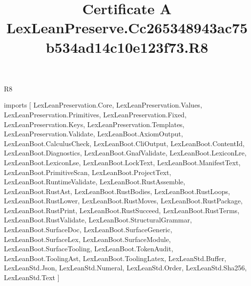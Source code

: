 \begin{lexlean}{R8}
\title{Certificate A LexLeanPreserve.Cc265348943ac75b534ad14c10e123f73.R8}
\begin{coremodule}
imports [
  LexLeanPreservation.Core,
  LexLeanPreservation.Values,
  LexLeanPreservation.Primitives,
  LexLeanPreservation.Fixed,
  LexLeanPreservation.Keys,
  LexLeanPreservation.Templates,
  LexLeanPreservation.Validate,
  LexLeanBoot.AxiomOutput,
  LexLeanBoot.CalculusCheck,
  LexLeanBoot.CliOutput,
  LexLeanBoot.ContentId,
  LexLeanBoot.Diagnostics,
  LexLeanBoot.GnafValidate,
  LexLeanBoot.LexiconLre,
  LexLeanBoot.LexiconLse,
  LexLeanBoot.LockText,
  LexLeanBoot.ManifestText,
  LexLeanBoot.PrimitiveScan,
  LexLeanBoot.ProjectText,
  LexLeanBoot.RuntimeValidate,
  LexLeanBoot.RustAssemble,
  LexLeanBoot.RustAst,
  LexLeanBoot.RustBodies,
  LexLeanBoot.RustLoops,
  LexLeanBoot.RustLower,
  LexLeanBoot.RustMoves,
  LexLeanBoot.RustPackage,
  LexLeanBoot.RustPrint,
  LexLeanBoot.RustSucceed,
  LexLeanBoot.RustTerms,
  LexLeanBoot.RustValidate,
  LexLeanBoot.StructuralGrammar,
  LexLeanBoot.SurfaceDoc,
  LexLeanBoot.SurfaceGeneric,
  LexLeanBoot.SurfaceLex,
  LexLeanBoot.SurfaceModule,
  LexLeanBoot.SurfaceTooling,
  LexLeanBoot.TokenAudit,
  LexLeanBoot.ToolingAst,
  LexLeanBoot.ToolingLatex,
  LexLeanStd.Buffer,
  LexLeanStd.Json,
  LexLeanStd.Numeral,
  LexLeanStd.Order,
  LexLeanStd.Sha256,
  LexLeanStd.Text
]


\end{coremodule}
\end{lexlean}
